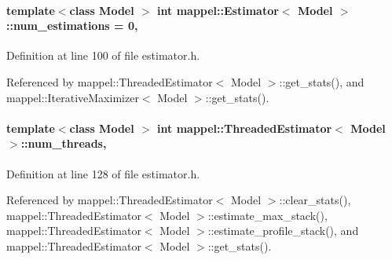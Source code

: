 \paragraph[{\texorpdfstring{num\+\_\+estimations}{num_estimations}}]{\setlength{\rightskip}{0pt plus 5cm}template$<$class Model $>$ int {\bf mappel\+::\+Estimator}$<$ Model $>$\+::num\+\_\+estimations = 0\hspace{0.3cm}{\ttfamily [protected]}, {\ttfamily [inherited]}}\hypertarget{classmappel_1_1Estimator_ab15b88435d6c50a68fac84465d950b12}{}\label{classmappel_1_1Estimator_ab15b88435d6c50a68fac84465d950b12}


Definition at line 100 of file estimator.\+h.



Referenced by mappel\+::\+Threaded\+Estimator$<$ Model $>$\+::get\+\_\+stats(), and mappel\+::\+Iterative\+Maximizer$<$ Model $>$\+::get\+\_\+stats().

\paragraph[{\texorpdfstring{num\+\_\+threads}{num_threads}}]{\setlength{\rightskip}{0pt plus 5cm}template$<$class Model $>$ int {\bf mappel\+::\+Threaded\+Estimator}$<$ Model $>$\+::num\+\_\+threads\hspace{0.3cm}{\ttfamily [protected]}, {\ttfamily [inherited]}}\hypertarget{classmappel_1_1ThreadedEstimator_a6afa05d7d971f3317ce1602de853123b}{}\label{classmappel_1_1ThreadedEstimator_a6afa05d7d971f3317ce1602de853123b}


Definition at line 128 of file estimator.\+h.



Referenced by mappel\+::\+Threaded\+Estimator$<$ Model $>$\+::clear\+\_\+stats(), mappel\+::\+Threaded\+Estimator$<$ Model $>$\+::estimate\+\_\+max\+\_\+stack(), mappel\+::\+Threaded\+Estimator$<$ Model $>$\+::estimate\+\_\+profile\+\_\+stack(), and mappel\+::\+Threaded\+Estimator$<$ Model $>$\+::get\+\_\+stats().

